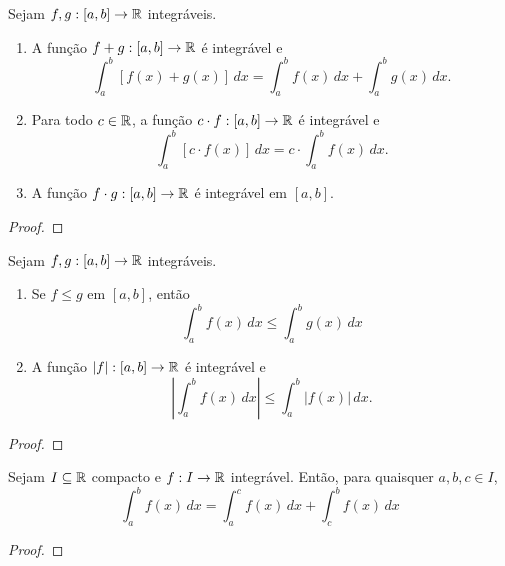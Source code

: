 \begin{proposition}
    Sejam $f,g : [a,b] \to \mathbb{R}$ integráveis.
        \begin{enumerate}[leftmargin=*, align=left, label=\textbf{(\alph*)}]
            \item A função $f + g : [a,b] \to \mathbb{R}$ é integrável e
                \[
                    \int_{a}^{b} [f(x) + g(x)] \, dx = \int_{a}^{b} f(x) \, dx + \int_{a}^{b} g(x) \, dx.
                \]
            \item Para todo $c \in \mathbb{R}$, a função $c \cdot f : [a,b] \to \mathbb{R}$ é integrável e
                \[
                    \int_{a}^{b} [c \cdot f(x)] \, dx = c \cdot \int_{a}^{b} f(x) \, dx.
                \]
            \item A função $f \cdot g : [a,b] \to \mathbb{R}$ é integrável em $[a,b]$.
        \end{enumerate}
\end{proposition}

\begin{proof}
    \blackproof
\end{proof}

\begin{proposition}
    Sejam $f,g : [a,b] \to \mathbb{R}$ integráveis.
        \begin{enumerate}[leftmargin=*, align=left, label=\textbf{(\alph*)}]
            \item Se $f \leq g$ em $[a,b]$, então
                \[
                    \int_{a}^{b} f(x) \, dx \leq \int_{a}^{b} g(x) \, dx
                \]
            \item A função $|f| : [a,b] \to \mathbb{R}$ é integrável e
                \[
                    \left| \int_{a}^{b} f(x) \, dx  \right| \leq \int_{a}^{b} |f(x)| \, dx.
                \]
        \end{enumerate}
\end{proposition}

\begin{proof}
    \blackproof
\end{proof}

\begin{proposition}
    Sejam $I \subseteq \mathbb{R}$ compacto e $f : I \to \mathbb{R}$ integrável. Então, para quaisquer $a,b,c \in I$,
        \[
            \int_{a}^{b} f(x) \, dx = \int_{a}^{c} f(x) \, dx + \int_{c}^{b} f(x) \, dx
        \]
\end{proposition}

\begin{proof}
    \blackproof
\end{proof}


